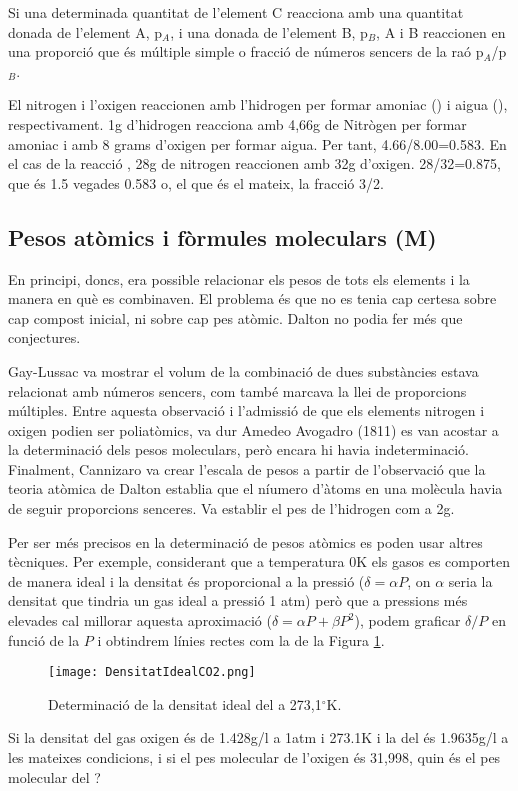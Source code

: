 \begin{mdframed}[backgroundcolor=gray!30,frametitle=Llei de les proporcions equivalents]
Si una determinada quantitat de l'element C reacciona amb una quantitat donada de l'element A, p$_A$, i una donada de l'element B, p$_B$, A i B reaccionen en una proporció que és múltiple simple o fracció de números sencers de la raó p$_A$/p$_B$.
\end{mdframed}

El nitrogen i l'oxigen reaccionen amb l'hidrogen per formar amoniac () i aigua (), respectivament. 1g d'hidrogen reacciona amb 4,66g de Nitrògen per formar amoniac i amb 8 grams d'oxigen per formar aigua. Per tant, 4.66/8.00=0.583.
En el cas de la reacció , 28g de nitrogen reaccionen amb 32g d'oxigen. 28/32=0.875, que és 1.5 vegades 0.583 o, el que és el mateix, la fracció 3/2.



\subsection{Pesos atòmics i fòrmules moleculars (M)}

En principi, doncs, era possible relacionar els pesos de tots els elements i la manera en què es combinaven. El problema és que no es tenia cap certesa sobre cap compost inicial, ni sobre cap pes atòmic. Dalton no podia fer més que conjectures.

Gay-Lussac va mostrar el volum de la combinació de dues substàncies estava relacionat amb números sencers, com també marcava la llei de proporcions múltiples. Entre aquesta observació i l'admissió de que els elements nitrogen i oxigen podien ser poliatòmics, va dur Amedeo Avogadro (1811) es van acostar a la determinació dels pesos moleculars, però encara hi havia indeterminació. Finalment, Cannizaro va crear l'escala de pesos a partir de l'observació que la teoria atòmica de Dalton establia que el níumero d'àtoms en una molècula havia de seguir proporcions senceres. Va establir el pes de l'hidrogen com a 2g.

Per ser més precisos en la determinació de pesos atòmics es poden usar altres tècniques. Per exemple, considerant que a temperatura 0K els gasos es comporten de manera ideal i la densitat és proporcional a la pressió ($\delta=\alpha P$, on $\alpha$ seria la densitat que tindria un gas ideal a pressió 1 atm) però que a pressions més elevades cal millorar aquesta aproximació ($\delta = \alpha P + \beta P^2$), podem graficar $\delta/P$ en funció de la $P$ i obtindrem línies rectes com la de la Figura \ref{fig:DensitatIdealCO2}.
\begin{figure}[h]
\centering
\texttt{[image: DensitatIdealCO2.png]}
\caption{Determinació de la densitat ideal del  a 273,1$^{\circ}$K.}
\label{fig:DensitatIdealCO2}
\end{figure}
\begin{exr}
Si la densitat del gas oxigen és de 1.428g/l a 1atm i 273.1K i la del  és 1.9635g/l a les mateixes condicions, i si el pes molecular de l'oxigen és 31,998, quin és el pes molecular del ?
\end{exr}

